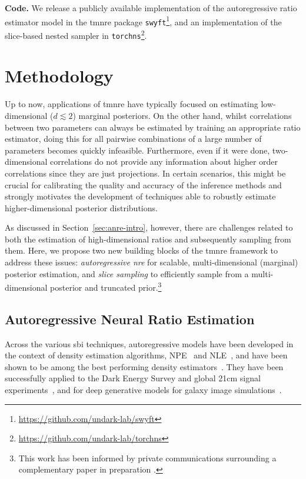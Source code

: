\vspace{10pt}
 \textbf{Code.} We release a publicly available implementation of the autoregressive ratio estimator model in the \gls*{tmnre} package \texttt{swyft}\footnote{\url{https://github.com/undark-lab/swyft}}, and an implementation of the slice-based nested sampler in \texttt{torchns}\footnote{\url{https://github.com/undark-lab/torchns}}.

\section{Methodology} \label{sec:anre-method}

 Up to now, applications of \gls*{tmnre} have typically focused on estimating low-dimensional ($d \lesssim 2$) marginal posteriors. On the other hand, whilst correlations between two parameters can always be estimated by training an appropriate ratio estimator, doing this for all pairwise combinations of a large number of parameters becomes quickly infeasible. Furthermore, even if it were done, two-dimensional correlations do not provide any information about higher order correlations since they are just projections. In certain scenarios, this might be crucial for calibrating the quality and accuracy of the inference methods and strongly motivates the development of techniques able to robustly estimate higher-dimensional posterior distributions.

As discussed in Section~\ref{sec:anre-intro}, however, there are challenges related to both the estimation of high-dimensional ratios and subsequently sampling from them. Here, we propose two new building blocks of the \gls*{tmnre} framework to address these issues: \emph{autoregressive \gls*{nre}} for scalable, multi-dimensional (marginal) posterior estimation, and \emph{slice sampling} to efficiently sample from a multi-dimensional posterior and truncated prior.\footnote{This work has been informed by private communications surrounding a complementary paper in preparation \cite{PolySwyft}.}
\clearpage

\subsection{Autoregressive Neural Ratio Estimation} \label{subsec:anre-anre}

 Across the various \gls*{sbi} techniques, autoregressive models have been developed in the context of density estimation algorithms, NPE~\cite{Uria:2016aa, Papamakarios:2017tec} and NLE~\cite{Papamakarios:2018aa}, and have been shown to be among the best performing density estimators~\cite{Lueckmann:2021aa}. They have been successfully applied to the Dark Energy Survey and global 21cm signal experiments~\cite{Bevins:2022qsc}, and for deep generative models for galaxy image simulations~\cite{Lanusse:2020aa}.

